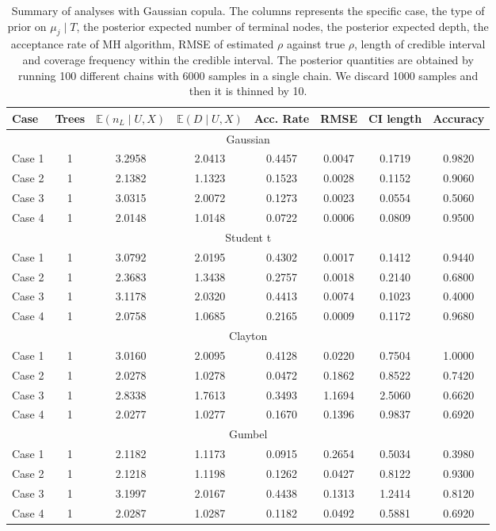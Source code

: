 \documentclass{amsart}
\begin{document}
\begin{table}[ht]
	\centering
	\scriptsize{
	\begin{tabular}{lc|cccccc}
		\toprule
		Case & Trees & $\mathbb{E}(n_L\mid U,X)$ & $\mathbb{E}(D\mid U,X)$ & Acc. Rate & RMSE & CI length & Accuracy \\ 
		\midrule
		\multicolumn{8}{c}{Gaussian} \\
		\midrule
		Case 1 & 1 & 3.2958 & 2.0413 & 0.4457 & 0.0047 & 0.1719 & 0.9820 \\ 
		Case 2 & 1 & 2.1382 & 1.1323 & 0.1523 & 0.0028 & 0.1152 & 0.9060 \\ 
		Case 3 & 1 & 3.0315 & 2.0072 & 0.1273 & 0.0023 & 0.0554 & 0.5060 \\ 
		Case 4 & 1 & 2.0148 & 1.0148 & 0.0722 & 0.0006 & 0.0809 & 0.9500 \\ 
		\midrule
		\multicolumn{8}{c}{Student t} \\
		\midrule
		Case 1 & 1 & 3.0792 & 2.0195 & 0.4302 & 0.0017 & 0.1412 & 0.9440 \\ 
		Case 2 & 1 & 2.3683 & 1.3438 & 0.2757 & 0.0018 & 0.2140 & 0.6800 \\ 
		Case 3 & 1 & 3.1178 & 2.0320 & 0.4413 & 0.0074 & 0.1023 & 0.4000 \\ 
		Case 4 & 1 & 2.0758 & 1.0685 & 0.2165 & 0.0009 & 0.1172 & 0.9680 \\ 
		\midrule
		\multicolumn{8}{c}{Clayton} \\
		\midrule
		Case 1 & 1 & 3.0160 & 2.0095 & 0.4128 & 0.0220 & 0.7504 & 1.0000 \\ 
		Case 2 & 1 & 2.0278 & 1.0278 & 0.0472 & 0.1862 & 0.8522 & 0.7420 \\ 
		Case 3 & 1 & 2.8338 & 1.7613 & 0.3493 & 1.1694 & 2.5060 & 0.6620 \\ 
		Case 4 & 1 & 2.0277 & 1.0277 & 0.1670 & 0.1396 & 0.9837 & 0.6920 \\
		\midrule
		\multicolumn{8}{c}{Gumbel} \\
		\midrule
		Case 1 & 1 & 2.1182 & 1.1173 & 0.0915 & 0.2654 & 0.5034 & 0.3980 \\ 
		Case 2 & 1 & 2.1218 & 1.1198 & 0.1262 & 0.0427 & 0.8122 & 0.9300 \\ 
		Case 3 & 1 & 3.1997 & 2.0167 & 0.4438 & 0.1313 & 1.2414 & 0.8120 \\ 
		Case 4 & 1 & 2.0287 & 1.0287 & 0.1182 & 0.0492 & 0.5881 & 0.6920 \\ 
		\bottomrule
		\end{tabular}}
	\caption{Summary of analyses with Gaussian copula. The columns represents the specific case, the type of prior on $\mu_j\mid T$, the posterior expected number of terminal nodes, the posterior expected depth, the acceptance rate of MH algorithm, RMSE of estimated $\rho$ against true $\rho$, length of credible interval and coverage frequency within the credible interval. The posterior quantities are obtained by running 100 different chains with 6000 samples in a single chain. We discard 1000 samples and then it is thinned by 10.}
	\label{tab:gauss:summary}
\end{table}
\end{document}
